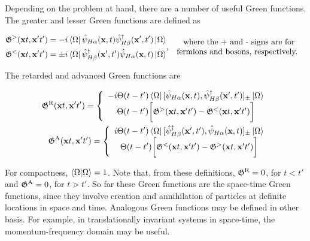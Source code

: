Depending on the problem at hand, there are a number of useful Green functions. The greater and lesser Green functions are defined as 

\begin{equation}
    \begin{split}
       \mathfrak{G}^{>}({\bf x}t, {\bf x}' t') = -i \bra{\Omega}\hat{\psi}_{H \alpha}({\bf x}, t) \hat{\psi}^\dagger_{H \beta}({\bf x}', t') \ket{\Omega}
        \\
       \mathfrak{G}^{<}({\bf x}t, {\bf x}' t') = \pm i \bra{\Omega} \hat{\psi}^\dagger_{H \beta}({\bf x}', t') \hat{\psi}_{H \alpha}({\bf x}, t) \ket{\Omega}
    \end{split}, \begin{array}{c}
         \textnormal{ where the + and - signs are for}  \\
         \textnormal{ fermions and bosons, respectively. }
    \end{array}
\end{equation}

The retarded and advanced Green functions are 

\begin{equation}
    \begin{split}
         \mathfrak{G}^{\textnormal{R}}({\bf x}t, {\bf x}' t') = \left\{\begin{array}{c}
              -i \Theta(t-t')  \bra{\Omega}[\hat{\psi}_{H \alpha}({\bf x}, t),  \hat{\psi}^\dagger_{H \beta}({\bf x}', t')]_{\pm} \ket{\Omega}   \\
              \Theta(t-t') \bigg[\mathfrak{G}^{>}({\bf x}t, {\bf x}' t') - \mathfrak{G}^{<}({\bf x}t, {\bf x}' t')\bigg]
         \end{array} \right. \\
         \mathfrak{G}^{\textnormal{A}}({\bf x}t, {\bf x}' t') = \left\{\begin{array}{c}
              i \Theta(t-t')  \bra{\Omega}[\hat{\psi}^\dagger_{H \beta}({\bf x}', t'), \hat{\psi}_{H \alpha}({\bf x}, t)]_{\pm} \ket{\Omega}   \\
              \Theta(t-t') \bigg[\mathfrak{G}^{<}({\bf x}t, {\bf x}' t') - \mathfrak{G}^{>}({\bf x}t, {\bf x}' t')\bigg]
         \end{array} \right. 
 \end{split}
\end{equation}

For compactness, $\bra{\Omega} \ket{\Omega} = 1$. Note that, from these definitions, $ \mathfrak{G}^{\textnormal{R}} = 0$, for $t < t'$ and $ \mathfrak{G}^{\textnormal{A}} = 0$, for $t > t'$. So far these Green functions are the space-time Green functions, since they involve creation and annihilation of particles at definite locations in space and time. Analogous Green functions may be defined in other basis. For example, in translationally invariant systems in space-time, the momentum-frequency domain may be useful. \\

